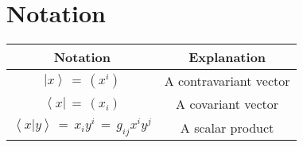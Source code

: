 %
%

\chapter{Notation}

\begin{tabular}{|c|c|}
\hline
\bf{Notation} & \bf{Explanation} \tabularnewline
\hline
$\left| x \right> \,=\, \left( x^i \right) $ & A contravariant vector \tabularnewline
\hline
$\left< x \right| \,=\, \left( x_i \right) $ & A covariant vector \tabularnewline
\hline
$\left< x | y \right> \,=\, x_i y^i \,=\, g_{ij} x^i y^j $ & A scalar product \tabularnewline
\hline
\end{tabular}
